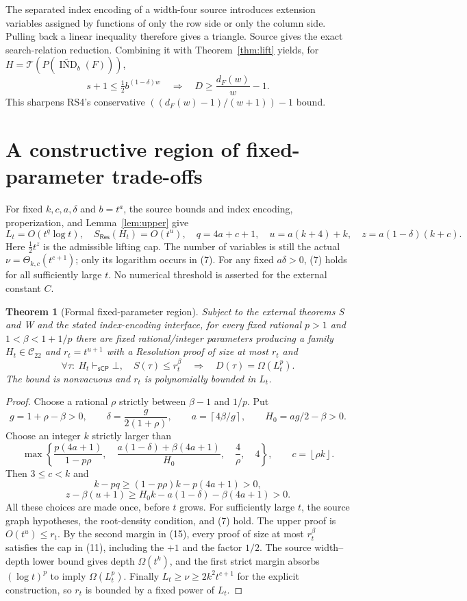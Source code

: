 \documentclass[11pt]{article}
\newtheorem{theorem}{Theorem}
\newcommand{\IND}{\operatorname{IND}}
\newcommand{\Res}{\mathsf{Res}}
\newcommand{\sCP}{\mathsf{sCP}}
\newcommand{\Cdom}{\mathcal C_{22}}
\newcommand{\Tcomp}{\mathcal T}
\newcommand{\ceil}[1]{\left\lceil #1\right\rceil}
\newcommand{\floor}[1]{\left\lfloor #1\right\rfloor}
\begin{document}
The separated index encoding of a width-four source introduces extension
variables assigned by functions of only the row side or only the column
side. Pulling back a linear inequality therefore gives a triangle. Source
\cite[Section 2.6]{tradeoff} gives the exact search-relation reduction.
Combining it with Theorem~\ref{thm:lift} yields, for
$H=\Tcomp(P(\widetilde{\IND}_b(F)))$,
\[
 s+1\le\tfrac12b^{(1-\delta)w}
 \quad\Longrightarrow\quad
 D\ge\frac{d_F(w)}{w}-1.                                \tag{11}
\]
This sharpens RS4's conservative $((d_F(w)-1)/(w+1))-1$ bound.

\section{A constructive region of fixed-parameter trade-offs}\label{sec:parameters}
For fixed $k,c,a,\delta$ and $b=t^a$, the source bounds and index encoding,
properization, and Lemma~\ref{lem:upper} give
\[
 L_t=O(t^q\log t),\quad S_{\Res}(H_t)=O(t^u),\quad
 q=4a+c+1,\quad u=a(k+4)+k,\quad z=a(1-\delta)(k+c).       \tag{12}
\]
Here $\tfrac12t^z$ is the admissible lifting cap. The number of variables is
still the actual $\nu=\Theta_{k,c}(t^{c+1})$; only its logarithm occurs in
(7). For any fixed $a\delta>0$, (7) holds for all sufficiently large $t$.
No numerical threshold is asserted for the external constant $C$.

\begin{theorem}[Formal fixed-parameter region]\label{thm:region}
Subject to the external theorems S and W and the stated index-encoding
interface, for every fixed rational $p>1$ and $1<\beta<1+1/p$ there are
fixed rational/integer parameters producing a family $H_t\in\Cdom$ and
$r_t=t^{u+1}$ with a Resolution proof of size at most $r_t$ and
\[
 \forall\tau:\ H_t\vdash_{\sCP}\bot,
 \quad S(\tau)\le r_t^\beta
 \quad\Longrightarrow\quad D(\tau)=\Omega(L_t^p).        \tag{13}
\]
The bound is nonvacuous and $r_t$ is polynomially bounded in $L_t$.
\end{theorem}
\begin{proof}
Choose a rational $\rho$ strictly between $\beta-1$ and $1/p$. Put
\[
 g=1+\rho-\beta>0,\qquad
 \delta=\frac{g}{2(1+\rho)},\qquad
 a=\ceil{4\beta/g},\qquad H_0=ag/2-\beta>0.
\]
Choose an integer $k$ strictly larger than
\[
 \max\left\{
 \frac{p(4a+1)}{1-p\rho},\quad
 \frac{a(1-\delta)+\beta(4a+1)}{H_0},\quad
 \frac4\rho,\quad4\right\},\qquad c=\floor{\rho k}.       \tag{14}
\]
Then $3\le c<k$ and
\[
 k-pq\ge(1-p\rho)k-p(4a+1)>0,
\]
\[
 z-\beta(u+1)
 \ge H_0 k-a(1-\delta)-\beta(4a+1)>0.                    \tag{15}
\]
All these choices are made once, before $t$ grows. For sufficiently large
$t$, the source graph hypotheses, the root-density condition, and (7) hold.
The upper proof is $O(t^u)\le r_t$. By the second margin in (15), every
proof of size at most $r_t^\beta$ satisfies the cap in (11), including the
$+1$ and the factor $1/2$. The source width--depth lower bound gives depth
$\Omega(t^k)$, and the first strict margin absorbs $(\log t)^p$ to imply
$\Omega(L_t^p)$. Finally $L_t\ge\nu\ge2k^2t^{c+1}$ for the explicit
construction, so $r_t$ is bounded by a fixed power of $L_t$.
\end{proof}
\end{document}
